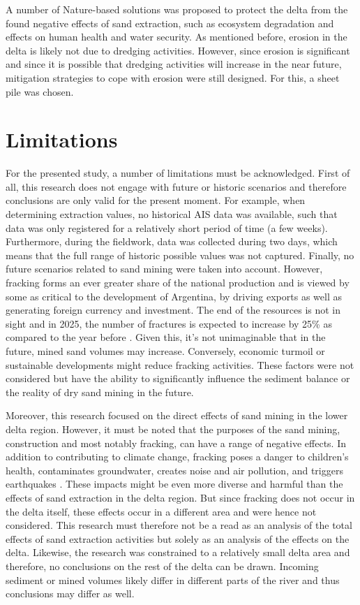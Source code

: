 A number of Nature-based solutions was proposed to protect the delta from the found negative effects of sand extraction, such as ecosystem degradation and effects on human health and water security. As mentioned before, erosion in the delta is likely not due to dredging activities. However, since erosion is significant and since it is possible that dredging activities will increase in the near future, mitigation strategies to cope with erosion were still designed. For this, a sheet pile was chosen.

\section{Limitations}
For the presented study, a number of limitations must be acknowledged. First of all, this research does not engage with future or historic scenarios and therefore conclusions are only valid for the present moment. For example, when determining extraction values, no historical AIS data was available, such that data was only registered for a relatively short period of time (a few weeks). Furthermore, during the fieldwork, data was collected during two days, which means that the full range of historic possible values was not captured. Finally, no future scenarios related to sand mining were taken into account. However, fracking forms an ever greater share of the national production and is viewed by some as critical to the development of Argentina, by driving exports as well as generating foreign currency and investment. The end of the resources is not in sight and in 2025, the number of fractures is expected to increase by 25\% as compared to the year before \autocite{barnedaFrackingVacaMuerta2025}. Given this, it's not unimaginable that in the future, mined sand volumes may increase. Conversely, economic turmoil or sustainable developments might reduce fracking activities. These factors were not considered but have the ability to significantly influence the sediment balance or the reality of dry sand mining in the future.

Moreover, this research focused on the direct effects of sand mining in the lower delta region. However, it must be noted that the purposes of the sand mining, construction and most notably fracking, can have a range of negative effects. In addition to contributing to climate change, fracking poses a danger to children's health, contaminates groundwater, creates noise and air pollution, and triggers earthquakes \autocite{nussbaumYaleEnvironmentalHealth2024}. These impacts might be even more diverse and harmful than the effects of sand extraction in the delta region. But since fracking does not occur in the delta itself, these effects occur in a different area and were hence not considered. This research must therefore not be a read as an analysis of the total effects of sand extraction activities but solely as an analysis of the effects on the delta. Likewise, the research was constrained to a relatively small delta area and therefore, no conclusions on the rest of the delta can be drawn. Incoming sediment or mined volumes likely differ in different parts of the river and thus conclusions may differ as well.

